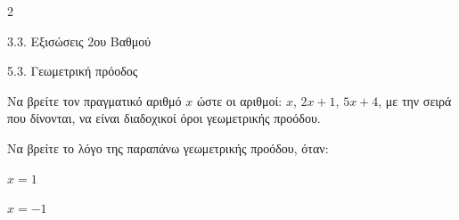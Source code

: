 \begin{ylh}{2}
    \item 3.3. Εξισώσεις 2ου Βαθμού
    \item 5.3. Γεωμετρική πρόοδος
\end{ylh}

\begin{alist}
\item Να βρείτε τον πραγματικό αριθμό $x$ ώστε οι αριθμοί: $x$, $2x + 1$, $5x + 4$, με την σειρά που δίνονται, να είναι διαδοχικοί όροι γεωμετρικής προόδου.
\item Να βρείτε το λόγο της παραπάνω γεωμετρικής προόδου, όταν:

\begin{rlist}
\item $x = 1$

\item $x = -1$
\end{rlist}
\end{alist}

